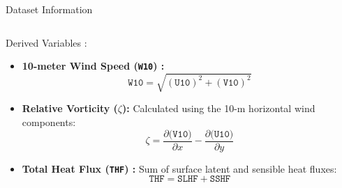 \documentclass[8pt, aspectratio=169]{beamer}
\begin{document}
\begin{frame}{Dataset Information}
\begin{columns}[T, totalwidth=0.9\textwidth]
        \footnotesize
        \begin{block}{Derived Variables :}
            \begin{itemize}
                \item \textbf{10-meter Wind Speed (\texttt{W10}) :}
                \begin{equation}
                    \texttt{W10} = \sqrt{(\texttt{U10})^2 + (\texttt{V10})^2}
                \end{equation}
            \item \textbf{Relative Vorticity (\texttt{$\zeta$}):} Calculated using the 10-m horizontal wind components:
                \begin{equation}
                    \zeta = \frac{\partial(\texttt{V10)}}{\partial x} - \frac{\partial(\texttt{U10)}}{\partial y}
                \end{equation}
            \item \textbf{Total Heat Flux (\texttt{THF}) :} Sum of surface latent and sensible heat fluxes:
                \begin{equation}
                    \texttt{THF} = \texttt{SLHF} + \texttt{SSHF}
                \end{equation} 
            \end{itemize}
        \end{block}
    \end{columns}
\end{frame}
\end{document}
